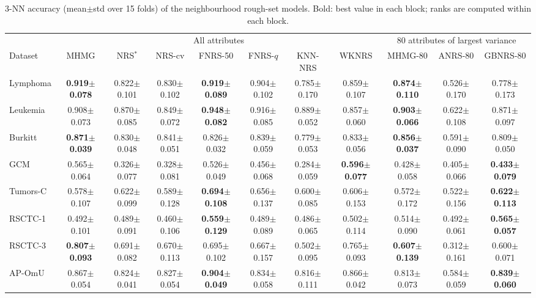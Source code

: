 \begin{table}[!t]
\centering
\caption{3-NN accuracy (mean$\pm$std over 15 folds) of the neighbourhood rough-set models. Bold: best value in each block; ranks are computed within each block.}
\label{tab:fam_knn}
\scriptsize
\setlength{\tabcolsep}{1.6pt}
\begin{tabular*}{\textwidth}{@{\extracolsep{\fill}}lcccccccccc@{}}
\toprule
 & \multicolumn{7}{c}{All attributes} & \multicolumn{3}{c}{80 attributes of largest variance} \\
\cmidrule(lr){2-8}\cmidrule(l){9-11}
Dataset & MHMG & NRS$^*$ & NRS-cv & FNRS-50 & FNRS-$q$ & KNN-NRS & WKNRS & MHMG-80 & ANRS-80 & GBNRS-80 \\
\midrule
Lymphoma & \textbf{0.919$\pm$0.078} & 0.822$\pm$0.101 & 0.830$\pm$0.102 & \textbf{0.919$\pm$0.089} & 0.904$\pm$0.102 & 0.785$\pm$0.170 & 0.859$\pm$0.107 & \textbf{0.874$\pm$0.110} & 0.526$\pm$0.170 & 0.778$\pm$0.173 \\
Leukemia & 0.908$\pm$0.073 & 0.870$\pm$0.085 & 0.849$\pm$0.072 & \textbf{0.948$\pm$0.082} & 0.916$\pm$0.085 & 0.889$\pm$0.052 & 0.857$\pm$0.060 & \textbf{0.903$\pm$0.066} & 0.622$\pm$0.108 & 0.871$\pm$0.097 \\
Burkitt & \textbf{0.871$\pm$0.039} & 0.830$\pm$0.048 & 0.841$\pm$0.051 & 0.826$\pm$0.032 & 0.839$\pm$0.059 & 0.779$\pm$0.053 & 0.833$\pm$0.056 & \textbf{0.856$\pm$0.037} & 0.591$\pm$0.090 & 0.809$\pm$0.050 \\
GCM & 0.565$\pm$0.064 & 0.326$\pm$0.077 & 0.328$\pm$0.081 & 0.526$\pm$0.049 & 0.456$\pm$0.068 & 0.284$\pm$0.059 & \textbf{0.596$\pm$0.077} & 0.428$\pm$0.058 & 0.405$\pm$0.066 & \textbf{0.433$\pm$0.079} \\
Tumors-C & 0.578$\pm$0.107 & 0.622$\pm$0.099 & 0.589$\pm$0.128 & \textbf{0.694$\pm$0.108} & 0.656$\pm$0.137 & 0.600$\pm$0.085 & 0.606$\pm$0.153 & 0.572$\pm$0.172 & 0.522$\pm$0.156 & \textbf{0.622$\pm$0.113} \\
RSCTC-1 & 0.492$\pm$0.101 & 0.489$\pm$0.091 & 0.460$\pm$0.106 & \textbf{0.559$\pm$0.129} & 0.489$\pm$0.089 & 0.486$\pm$0.065 & 0.502$\pm$0.114 & 0.514$\pm$0.090 & 0.492$\pm$0.061 & \textbf{0.565$\pm$0.057} \\
RSCTC-3 & \textbf{0.807$\pm$0.093} & 0.691$\pm$0.082 & 0.670$\pm$0.113 & 0.695$\pm$0.102 & 0.667$\pm$0.157 & 0.502$\pm$0.095 & 0.765$\pm$0.093 & \textbf{0.607$\pm$0.139} & 0.312$\pm$0.161 & 0.600$\pm$0.071 \\
AP-OmU & 0.867$\pm$0.054 & 0.824$\pm$0.041 & 0.827$\pm$0.054 & \textbf{0.904$\pm$0.049} & 0.834$\pm$0.058 & 0.816$\pm$0.111 & 0.866$\pm$0.042 & 0.813$\pm$0.073 & 0.584$\pm$0.059 & \textbf{0.839$\pm$0.060} \\

\end{tabular*}
\end{table}
